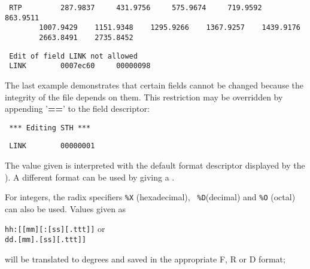 %
\svbegin \begin{verbatim} 
 RTP         287.9837     431.9756     575.9674     719.9592     863.9511
	    1007.9429    1151.9348    1295.9266    1367.9257    1439.9176
	    2663.8491    2735.8452
\end{verbatim} 
\svend 
\spend %
%
\spbegin %
%
\svbegin \begin{verbatim} Edit of field LINK not allowed 
 LINK        0007ec60     00000098 
\end{verbatim} 
\svend 
\spend %
%

	The last example demonstrates that certain fields cannot be changed
because the integrity of the file depends on them.  This restriction may be
overridden by appending '{\bf ==}' to the field descriptor: 

\spbegin %
\svbegin \begin{verbatim} 
 *** Editing STH *** 
\end{verbatim}\svend 
%
%
\svbegin \begin{verbatim} 
 LINK        00000001
\end{verbatim} 
\svend 
\spend %

	The value given is interpreted with the default format descriptor
displayed by the ).  A different format can
be used by giving a 
. 

	For integers, the radix specifiers {\tt \%X} (hexadecimal), {\tt
\%D}(decimal) and {\tt \%O} (octal) can also be used.  Values given as

	\verb/hh:[[mm][:[ss][.ttt]]/ or \\ 
\indent \verb/dd.[mm].[ss][.ttt]]/ 

\noindent will be translated to degrees and saved in the appropriate F, 
R or D format; 



